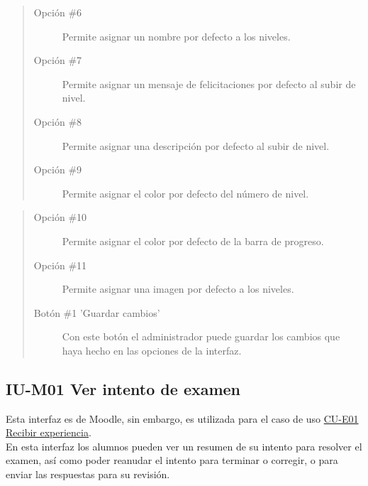     
    \begin{quote}
    \begin{description}
    	\item[Opción \#6] Permite asignar un nombre por defecto a los niveles.
    	\item[Opción \#7] Permite asignar un mensaje de felicitaciones por defecto al subir de nivel.
    	\item[Opción \#8] Permite asignar una descripción por defecto al subir de nivel.
    	\item[Opción \#9] Permite asignar el color por defecto del número de nivel.
    \end{description}
    \end{quote}
    
    
\clearpage
    
    
    \begin{quote}
    \begin{description}
    	\item[Opción \#10] Permite asignar el color por defecto de la barra de progreso.
    	\item[Opción \#11] Permite asignar una imagen por defecto a los niveles.
    	\item[Botón \#1 'Guardar cambios'] Con este botón el administrador puede guardar los cambios que haya hecho en las opciones de la interfaz.
    \end{description}
    \end{quote}
    
\clearpage

\subsection*{IU-M01 Ver intento de examen}
\label{IUM01}

    Esta interfaz es de Moodle, sin embargo, es utilizada para el caso de uso \hyperref[CU-E01]{CU-E01 Recibir experiencia}.\\
    
    \noindent En esta interfaz los alumnos pueden ver un resumen de su intento para resolver el examen, así como poder reanudar el intento para terminar o corregir, o para enviar las respuestas para su revisión.   

    
